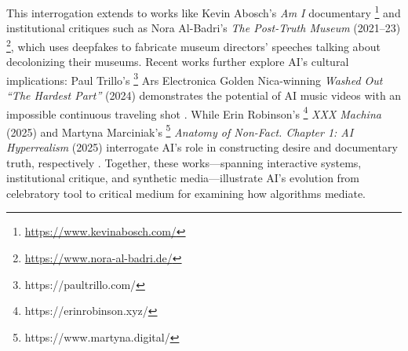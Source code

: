 \documentclass[sigconf,nonacm]{acmart}
\begin{document}
This interrogation extends to works like Kevin Abosch's \textit{Am I} documentary \cite{patella2025artevivente}\footnote{\url{https://www.kevinabosch.com/}} and institutional critiques such as Nora Al-Badri's \textit{The Post-Truth Museum} (2021–23) \cite{Hicks2024GetReal}\footnote{\url{https://www.nora-al-badri.de/}}, which uses deepfakes to fabricate museum directors' speeches talking about decolonizing their museums. Recent works further explore AI's cultural implications: Paul Trillo's \footnote{https://paultrillo.com/} Ars Electronica Golden Nica-winning \textit{Washed Out “The Hardest Part”} (2024) demonstrates the potential of AI music videos with an impossible continuous traveling shot \cite{Trillo2024,Greene2024}. While Erin Robinson's \footnote{https://erinrobinson.xyz/} \textit{XXX Machina} (2025) and Martyna Marciniak's \footnote{https://www.martyna.digital/} \textit{Anatomy of Non-Fact. Chapter 1: AI Hyperrealism} (2025) interrogate AI's role in constructing desire and documentary truth, respectively \cite{Robinson2025,Starosta2025}. Together, these works—spanning interactive systems, institutional critique, and synthetic media—illustrate AI's evolution from celebratory tool to critical medium for examining how algorithms mediate.
\end{document}
